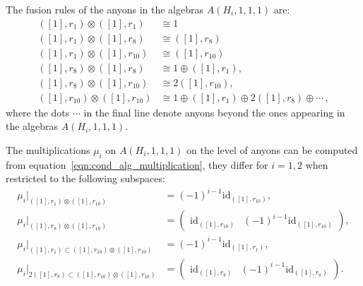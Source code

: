 \documentclass[aps,twocolumn,prx,floatfix,preprintnumbers, nofootinbib,10pt]{revtex4-2}
\numberwithin{equation}{section}
\theoremstyle{definition}
\newcommand{\be}{\begin{equation}}
\newcommand{\ee}{\end{equation}}
\newcommand{\ba}{\begin{aligned}}
\newcommand{\ea}{\end{aligned}}
\newcommand{\id}{\text{id}}
\newcommand{\ot}{\otimes}
\begin{document}
The fusion rules of the anyons in the algebras $A(H_i,1,1,1)$ are:
\be\ba
    ([1], r_1) \ot ([1], r_1) & \cong 1\\
    ([1], r_1) \ot ([1], r_8) & \cong ([1], r_8) \\
    ([1], r_1) \ot ([1], r_{10}) & \cong ([1], r_{10}) \\
    ([1],r_8) \ot ([1],r_8) & \cong 1 \oplus ([1],r_1),\\
    ([1], r_8) \ot ([1], r_{10}) & \cong 2 ([1], r_{10}), \\
    ([1],r_{10}) \ot ([1],r_{10}) & \cong 1 \oplus ([1],r_1) \oplus 2 ([1],r_8) \oplus \cdots \,,
\ea\ee
where the dots $\cdots$ in the final line denote anyons beyond the ones appearing in the algebras $A(H_i,1,1,1)$.

The multiplications $\mu_i$ on $A(H_i,1,1,1)$ on the level of anyons can be computed from equation~\eqref{eqn:cond_alg_multiplication}, they differ for $i=1,2$ when restricted to the following subspaces: 
\be
\ba
    \mu_{i}|_{([1],r_1) \ot ([1],r_{10})} & = (-1)^{i-1}\id_{([1],r_{10})},\\
    \mu_i|_{([1],r_8) \ot ([1],r_{10})} & = \begin{pmatrix}
        \id_{([1],r_{10})} & (-1)^{i-1} \id_{([1],r_{10})}
    \end{pmatrix},\\
    \mu_{i}|_{([1],r_1) \subset ([1],r_{10}) \ot ([1],r_{10})} & = (-1)^{i-1} \id_{([1],r_1)},\\
    \mu_{i}|_{2([1],r_8) \subset ([1],r_{10}) \ot ([1],r_{10})} & = \begin{pmatrix}
        \id_{([1],r_8)} & (-1)^{i-1} \id_{([1],r_8)}
    \end{pmatrix}.
\ea
\ee
\end{document}
